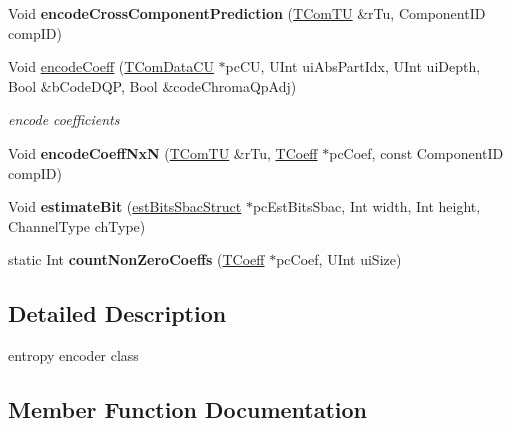 \begin{DoxyCompactItemize}
\mbox{\label{class_t_enc_entropy_aa0eef9a154f1a77943f5fbfac3c7730a}} 
Void {\bfseries encode\+Cross\+Component\+Prediction} (\hyperlink{class_t_com_t_u}{T\+Com\+TU} \&r\+Tu, Component\+ID comp\+ID)
\item 
\mbox{\label{class_t_enc_entropy_a2bbf32a5d83b40db4787379b12039506}} 
Void \hyperlink{class_t_enc_entropy_a2bbf32a5d83b40db4787379b12039506}{encode\+Coeff} (\hyperlink{class_t_com_data_c_u}{T\+Com\+Data\+CU} $\ast$pc\+CU, U\+Int ui\+Abs\+Part\+Idx, U\+Int ui\+Depth, Bool \&b\+Code\+D\+QP, Bool \&code\+Chroma\+Qp\+Adj)
\begin{DoxyCompactList}\small\item\em encode coefficients \end{DoxyCompactList}\item 
\mbox{\label{class_t_enc_entropy_a4b6c7bd56b070636af5848c4f96b1199}} 
Void {\bfseries encode\+Coeff\+NxN} (\hyperlink{class_t_com_t_u}{T\+Com\+TU} \&r\+Tu, \hyperlink{_type_def_8h_a5bdd3b17d14ed1978c366d2d958c0300}{T\+Coeff} $\ast$pc\+Coef, const Component\+ID comp\+ID)
\item 
\mbox{\label{class_t_enc_entropy_ae493d0ba16c6855b4fc7cf099aa1d9fc}} 
Void {\bfseries estimate\+Bit} (\hyperlink{structest_bits_sbac_struct}{est\+Bits\+Sbac\+Struct} $\ast$pc\+Est\+Bits\+Sbac, Int width, Int height, Channel\+Type ch\+Type)
\item 
\mbox{\label{class_t_enc_entropy_abc9aef0f8d89ccd63f3a7e8eff4c034c}} 
static Int {\bfseries count\+Non\+Zero\+Coeffs} (\hyperlink{_type_def_8h_a5bdd3b17d14ed1978c366d2d958c0300}{T\+Coeff} $\ast$pc\+Coef, U\+Int ui\+Size)
\end{DoxyCompactItemize}


\subsection{Detailed Description}
entropy encoder class 

\subsection{Member Function Documentation}
\mbox{\label{class_t_enc_entropy_a9ae7bfe8ecc4a081b5ac6e62a5390f7e}} 
